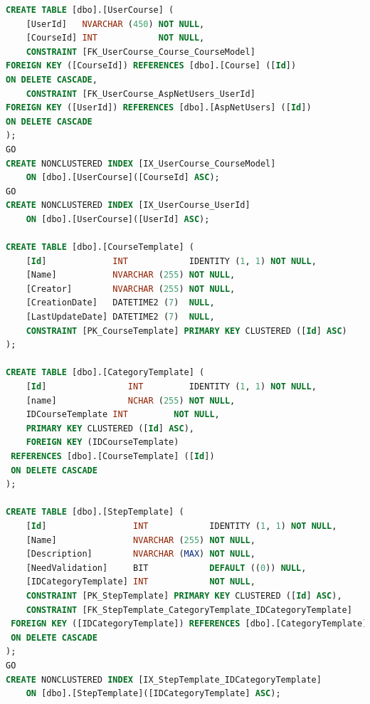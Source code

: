 \begin{lstlisting}[language=SQL, caption=traduzione della progettazione del database nel linguaggio SQL]
CREATE TABLE [dbo].[UserCourse] ( 
	[UserId]   NVARCHAR (450) NOT NULL, 
	[CourseId] INT            NOT NULL, 
	CONSTRAINT [FK_UserCourse_Course_CourseModel]  
FOREIGN KEY ([CourseId]) REFERENCES [dbo].[Course] ([Id]) 
ON DELETE CASCADE, 
	CONSTRAINT [FK_UserCourse_AspNetUsers_UserId]  
FOREIGN KEY ([UserId]) REFERENCES [dbo].[AspNetUsers] ([Id]) 
ON DELETE CASCADE 
); 
GO 
CREATE NONCLUSTERED INDEX [IX_UserCourse_CourseModel] 
    ON [dbo].[UserCourse]([CourseId] ASC); 
GO 
CREATE NONCLUSTERED INDEX [IX_UserCourse_UserId] 
    ON [dbo].[UserCourse]([UserId] ASC); 
 
CREATE TABLE [dbo].[CourseTemplate] ( 
    [Id]             INT            IDENTITY (1, 1) NOT NULL, 
    [Name]           NVARCHAR (255) NOT NULL, 
    [Creator]        NVARCHAR (255) NOT NULL, 
    [CreationDate]   DATETIME2 (7)  NULL, 
    [LastUpdateDate] DATETIME2 (7)  NULL, 
    CONSTRAINT [PK_CourseTemplate] PRIMARY KEY CLUSTERED ([Id] ASC) 
); 
 
CREATE TABLE [dbo].[CategoryTemplate] ( 
    [Id]                INT         IDENTITY (1, 1) NOT NULL, 
    [name]              NCHAR (255) NOT NULL, 
    IDCourseTemplate INT         NOT NULL, 
    PRIMARY KEY CLUSTERED ([Id] ASC), 
    FOREIGN KEY (IDCourseTemplate)  
 REFERENCES [dbo].[CourseTemplate] ([Id]) 
 ON DELETE CASCADE 
); 
 
CREATE TABLE [dbo].[StepTemplate] ( 
    [Id]                 INT            IDENTITY (1, 1) NOT NULL, 
    [Name]               NVARCHAR (255) NOT NULL, 
    [Description]        NVARCHAR (MAX) NOT NULL, 
    [NeedValidation]     BIT            DEFAULT ((0)) NULL, 
    [IDCategoryTemplate] INT            NOT NULL, 
    CONSTRAINT [PK_StepTemplate] PRIMARY KEY CLUSTERED ([Id] ASC), 
    CONSTRAINT [FK_StepTemplate_CategoryTemplate_IDCategoryTemplate]  
 FOREIGN KEY ([IDCategoryTemplate]) REFERENCES [dbo].[CategoryTemplate] ([Id]) 
 ON DELETE CASCADE 
); 
GO 
CREATE NONCLUSTERED INDEX [IX_StepTemplate_IDCategoryTemplate] 
    ON [dbo].[StepTemplate]([IDCategoryTemplate] ASC);
\end{lstlisting}

